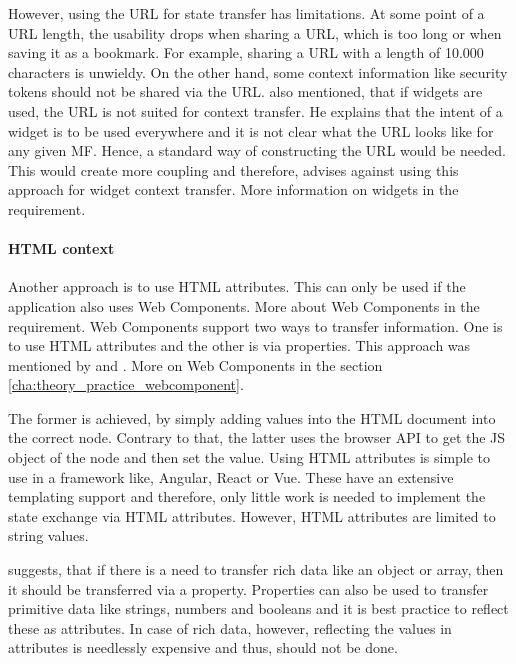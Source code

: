 However, using the \ac{URL} for state transfer has limitations.
At some point of a \ac{URL} length, the usability drops when sharing a \ac{URL}, which is too long or when saving it as a bookmark.
For example, sharing a \ac{URL} with a length of 10.000 characters is unwieldy.
On the other hand, some context information like security tokens should not be shared via the \ac{URL}.
\textciteRehm{} also mentioned, that if widgets are used, the \ac{URL} is not suited for context transfer.
He explains that the intent of a widget is to be used everywhere and it is not clear what the \ac{URL} looks like for any given \ac{MF}.
Hence, a standard way of constructing the \ac{URL} would be needed.
This would create more coupling and therefore, \citeauthorRehm{} advises against using this approach for widget context transfer.
More information on widgets in the \textit{} requirement.



\paragraph{\ac{HTML} context}
Another approach is to use \ac{HTML} attributes.
This can only be used if the application also uses Web Components.
More about Web Components in the \textit{} requirement.
Web Components support two ways to transfer information.
One is to use \ac{HTML} attributes and the other is via properties.
This approach was mentioned by \textciteRehm{} and \textciteSteyer{}.
More on Web Components in the section \ref{cha:theory_practice_webcomponent}.

The former is achieved, by simply adding values into the \ac{HTML} document into the correct node.
Contrary to that, the latter uses the browser \ac{API} to get the \ac{JS} object of the node and then set the value.
Using \ac{HTML} attributes is simple to use in a framework like, Angular, React or Vue.
These have an extensive templating support and therefore, only little work is needed to implement the state exchange via \ac{HTML} attributes.
However, \ac{HTML} attributes are limited to string values.

\textciteRehm{} suggests, that if there is a need to transfer rich data like an object or array, then it should be transferred via a property.
Properties can also be used to transfer primitive data like strings, numbers and booleans and it is best practice to reflect these as attributes\footnotemark[1]{}.
In case of rich data, however, reflecting the values in attributes is needlessly expensive and thus, should not be done\footnotemark[1]{}.

